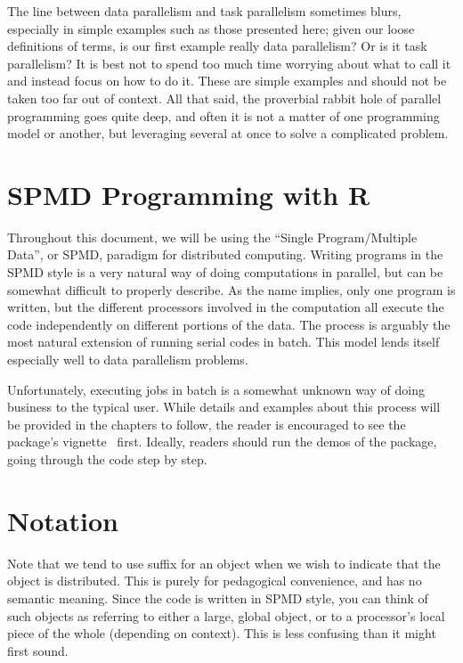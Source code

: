 The line between data parallelism and task parallelism sometimes blurs, especially in simple examples such as those presented here; given our loose definitions of terms, is our first example really data parallelism?  Or is it task parallelism?  It is best not to spend too much time worrying about what to call it and instead focus on how to do it.  These are simple examples and should not be taken too far out of context.  All that said, the proverbial rabbit hole of parallel programming goes quite deep, and often it is not a matter of one programming model or another, but leveraging several at once to solve a complicated problem.





\section{SPMD Programming with R}

Throughout this document, we will be using the ``Single Program/Multiple Data'', or SPMD, paradigm for distributed computing.  Writing programs in the SPMD style is a very natural way of doing computations in parallel, but can be somewhat difficult to properly describe.  As the name implies, only one program is written, but the different processors involved in the computation all execute the code independently on different portions of the data.  The process is arguably the most natural extension of running serial codes in batch.  This model lends itself especially well to data parallelism problems.

Unfortunately, executing jobs in batch is a somewhat unknown way of doing business to the typical  user.  While details and examples about this process will be provided in the chapters to follow, the reader is encouraged to see the  package's vignette~\citep{Chen2012pbdMPIvignette} first.  Ideally, readers should run the demos of the  package,
going through the code step by step.




\section{Notation}
\label{sec:notation}

Note that we tend to use suffix  for an object when we wish to indicate that the object is distributed.  This is purely for pedagogical convenience, and has no semantic meaning.  Since the code is written in SPMD style, you can think of such objects as referring to either a large, global object, or to a processor's local piece of the whole (depending on context).  This is less confusing than it might first sound.

